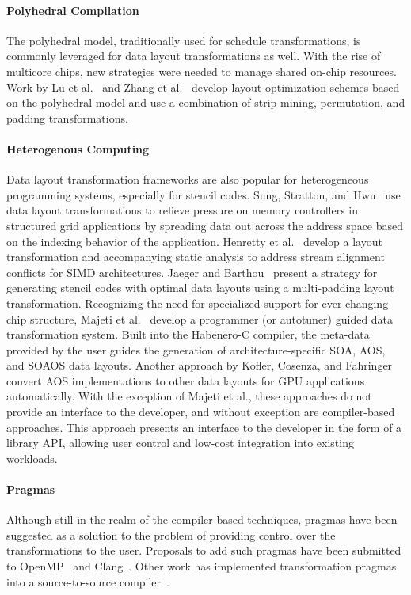 \paragraph{Polyhedral Compilation}
The polyhedral model, traditionally used for schedule transformations, is commonly leveraged for data layout transformations as well.
With the rise of multicore chips, new strategies were needed to manage shared on-chip resources. 
Work by Lu et al.~\cite{lu2009data} and Zhang et al.~\cite{zhang2011optimizing} develop layout optimization schemes based on the polyhedral model and use a combination of strip-mining, permutation, and padding transformations.

\paragraph{Heterogenous Computing}
Data layout transformation frameworks are also popular for heterogeneous programming systems, especially for stencil codes.
Sung, Stratton, and Hwu~\cite{sung2010data} use data layout transformations to relieve pressure on memory controllers in structured grid applications by spreading data out across the address space based on the indexing behavior of the application.
Henretty et al.~\cite{henretty2011data} develop a layout transformation and accompanying static analysis to address stream alignment conflicts for SIMD architectures.
Jaeger and Barthou~\cite{jaeger2012automatic} present a strategy for generating stencil codes with optimal data layouts using a multi-padding layout transformation.
Recognizing the need for specialized support for ever-changing chip structure, Majeti et al.~\cite{majeti2013compiler} develop a programmer (or autotuner) guided data transformation system.
Built into the Habenero-C compiler, the meta-data provided by the user guides the generation of architecture-specific SOA, AOS, and SOAOS data layouts.
Another approach by Kofler, Cosenza, and Fahringer~\cite{kofler2015automatic} convert AOS implementations to other data layouts for GPU applications automatically.  
With the exception of Majeti et al., these approaches do not provide an interface to the developer, and without exception are compiler-based approaches.
This approach presents an interface to the developer in the form of a library API, allowing user control and low-cost integration into existing workloads.

\paragraph{Pragmas}
Although still in the realm of the compiler-based techniques, pragmas have been suggested as a solution to the problem of providing control over the transformations to the user.
Proposals to add such pragmas have been submitted to OpenMP~\cite{kruse2019design} and Clang~\cite{kruse2018user}.
Other work has implemented transformation pragmas into a source-to-source compiler~\cite{xu2014semi}. 


